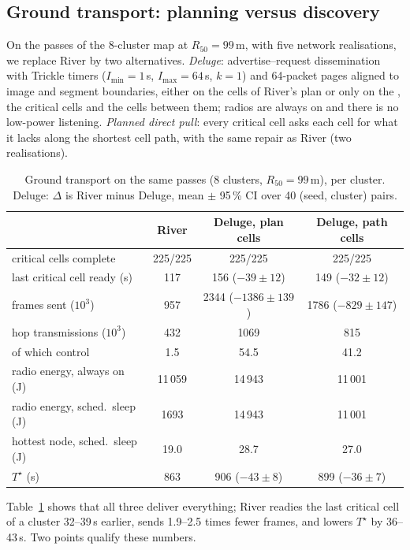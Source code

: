 \subsection{Ground transport: planning versus discovery}\label{sec:ground}
On the \chord{} passes of the 8-cluster map at $R_{50}=99$\,m, with five network realisations, we replace River by two
alternatives. \emph{Deluge}: advertise--request dissemination with Trickle timers ($I_{\min}=1$\,s, $I_{\max}=64$\,s,
$k=1$) and 64-packet pages aligned to image and segment boundaries, either on the cells of River's plan or only on the
\spine, the critical cells and the cells between them; radios are always on and there is no low-power listening.
\emph{Planned direct pull}: every critical cell asks each \spine{} cell for what it lacks along the shortest cell path,
with the same repair as River (two realisations).

\begin{table}[t]\centering
\caption{Ground transport on the same passes (8 clusters, $R_{50}=99$\,m), per cluster. Deluge: $\Delta$ is River minus
Deluge, mean $\pm$ 95\,\% CI over 40 (seed, cluster) pairs.}\label{tab:ground}
\setlength{\tabcolsep}{2pt}\scriptsize
\begin{tabular}{lccc}\toprule
 & River & Deluge, plan cells & Deluge, path cells\\\midrule
critical cells complete & 225/225 & 225/225 & 225/225\\
last critical cell ready (s) & 117 & 156 ($-39\pm12$) & 149 ($-32\pm12$)\\
frames sent ($10^3$) & 957 & 2344 ($-1386\pm139$) & 1786 ($-829\pm147$)\\
hop transmissions ($10^3$) & 432 & 1069 & 815\\
\quad of which control & 1.5 & 54.5 & 41.2\\
radio energy, always on (J) & 11\,059 & 14\,943 & 11\,001\\
radio energy, sched.\ sleep (J) & 1693 & 14\,943 & 11\,001\\
hottest node, sched.\ sleep (J) & 19.0 & 28.7 & 27.0\\
$T^\star$ (s) & 863 & 906 ($-43\pm8$) & 899 ($-36\pm7$)\\\bottomrule
\end{tabular}
\end{table}

Table~\ref{tab:ground} shows that all three deliver everything; River readies the last critical cell of a cluster
32--39\,s earlier, sends 1.9--2.5 times fewer frames, and lowers $T^\star$ by 36--43\,s. Two points qualify these numbers.

